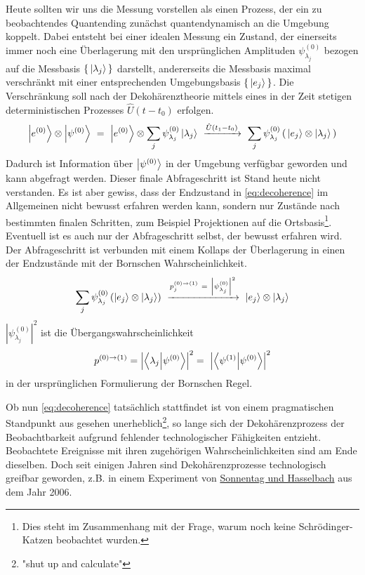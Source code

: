 \documentclass[12pt]{article}
\begin{document}
Heute sollten wir uns die Messung vorstellen als einen Prozess, der ein zu beobachtendes Quantending zunächst quantendynamisch an die Umgebung koppelt. 
Dabei entsteht bei einer idealen Messung ein Zustand, der einerseits immer noch eine Überlagerung mit den ursprünglichen Amplituden $\psi^{(0)}_{\lambda_j}$ bezogen auf die Messbasis $\{\,\ket{\lambda_j}\,\}$ darstellt, andererseits die Messbasis maximal verschränkt mit einer entsprechenden Umgebungsbasis $\{\,\ket{e_j}\,\}$. Die Verschränkung soll nach der Dekohärenztheorie mittels eines in der Zeit stetigen deterministischen Prozesses $\hat{U}(t-t_0)$ erfolgen.
\begin{equation}
\label{eq:decoherence}
\ket{e^{(0)}}\otimes\ket{\psi^{(0)}}\ =\ \ket{e^{(0)}}\otimes\sum_j \psi^{(0)}_{\lambda_j} \ket{\lambda_j}
\ \xrightarrow{\hat{U}(t_1-t_0)}\ \sum_j \psi^{(0)}_{\lambda_j} \left(\, \ket{e_j} \otimes \ket{\lambda_j}\, \right)
\end{equation}
Dadurch ist Information über $\ket{\psi^{(0)}}$ in der Umgebung verfügbar geworden und kann abgefragt werden. Dieser finale Abfrageschritt ist Stand heute nicht verstanden. Es ist aber gewiss, dass der Endzustand in \eqref{eq:decoherence} im Allgemeinen nicht bewusst erfahren werden kann, sondern nur Zustände nach bestimmten finalen Schritten, zum Beispiel Projektionen auf die Ortsbasis\footnote{Dies steht im Zusammenhang mit der Frage, warum noch keine Schrödinger-Katzen beobachtet wurden.}. Eventuell ist es auch nur der Abfrageschritt selbst, der bewusst erfahren wird. Der Abfrageschritt ist verbunden mit einem Kollaps der Überlagerung in einen der Endzustände mit der Bornschen Wahrscheinlichkeit.
\begin{equation} 
\label{eq:collapse}
\sum_j \psi^{(0)}_{\lambda_j} \left( \ket{e_j} \otimes \ket{\lambda_j} \right)
\ \xrightarrow{p_j^{(0)\rightarrow(1)}\ =\ \left|\psi^{(0)}_{\lambda_j}\right|^2}\ 
\ket{e_j} \otimes \ket{\lambda_j}
\end{equation}
$\left|\psi^{(0)}_{\lambda_j}\right|^2$ ist die Übergangswahrscheinlichkeit 
\begin{equation} 
\label{eq:orig_Born}
p^{(0)\rightarrow(1)} 
= \Bigl| \bra{\lambda_j}\ket{\psi^{(0)}} \Bigr| ^2
=\ \Bigl| \bra{\psi^{(1)}}\ket{\psi^{(0)}} \Bigr| ^2
\end{equation}
in der ursprünglichen Formulierung der Bornschen Regel.

Ob nun \eqref{eq:decoherence} tatsächlich stattfindet ist von einem pragmatischen Standpunkt aus gesehen unerheblich\footnote{"shut up and calculate"}, so lange sich der Dekohärenzprozess der Beobachtbarkeit aufgrund fehlender technologischer Fähigkeiten entzieht. Beobachtete Ereignisse mit ihren zugehörigen Wahrscheinlichkeiten sind am Ende dieselben. Doch seit einigen Jahren sind Dekohärenzprozesse technologisch greifbar geworden, z.B. in einem Experiment von \href{https://journals.aps.org/prl/abstract/10.1103/PhysRevLett.98.200402}{Sonnentag und Hasselbach} aus dem Jahr 2006.
\end{document}
